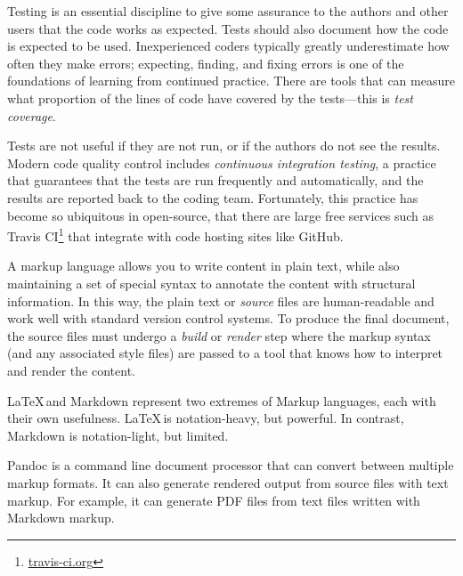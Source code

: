 Testing is an essential discipline to give some assurance to the authors and
other users that the code works as expected.
Tests should also document how the code is expected to be used.
Inexperienced coders typically greatly underestimate how often they make
errors; expecting, finding, and fixing errors is one of the foundations of
learning from continued practice.  There are tools that can measure what
proportion of the lines of code have covered by the tests---this is \emph{test
coverage}.


Tests are not useful if they are not run, or if the authors do not see the
results.  Modern code quality control includes \emph{continuous integration
testing}, a practice that guarantees that the tests are run frequently and
automatically, and the results are reported back to the coding team.
Fortunately, this practice has become so ubiquitous in open-source, that there
are large free services such as Travis
CI\footnote{\url{travis-ci.org}\label{travis-ci}} that integrate with code
hosting sites like GitHub.

%
A markup language allows you to write content in plain text, while also
maintaining a set of special syntax to annotate the content with structural
information.
In this way, the plain text or \emph{source} files are human-readable and work
well with standard version control systems.
To produce the final document, the source files must undergo a \emph{build} or
\emph{render}
step where the markup syntax (and any associated style files) are passed to a
tool that knows how to interpret and render the content.

\LaTeX\,and Markdown represent two extremes of Markup languages, each
with their own usefulness.
\LaTeX\,is notation-heavy, but powerful.
In contrast, Markdown is notation-light, but limited.

Pandoc is a command line document processor that can convert between multiple
markup formats.  It can also generate rendered output from source files with
text markup.  For example, it can generate PDF files from text files written
with Markdown markup.

